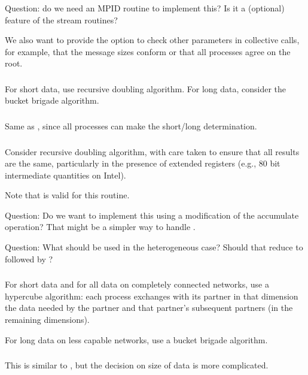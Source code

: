 \documentclass{article}
\begin{document}
Question: do we need an MPID routine to implement this? Is it a
(optional) feature of the stream routines?

We also want to provide the option to check other parameters in
collective calls, for example, that the message sizes conform or that
all processes agree on the root.

\subsubsection{}
For short data, use recursive doubling algorithm.  For long data, consider the
bucket brigade algorithm.

\subsubsection{}
Same as , since all processes can make the
short/long determination.

\subsubsection{}
Consider recursive doubling algorithm, with care taken to ensure that all
results are the same, particularly in the presence of extended registers
(e.g., 80 bit intermediate quantities on Intel).

Note that  is valid for this routine. 

Question: Do we want to implement this using a modification of the accumulate
operation?  That might be a simpler way to handle .

Question: What should be used in the heterogeneous case?  Should that
reduce to  followed by ?

\subsubsection{}
For short data and for all data on completely connected networks, use a
hypercube algorithm: each process exchanges with its partner in that dimension
the data needed by the partner and that partner's subsequent partners (in the
remaining dimensions).

For long data on less capable networks, use a bucket brigade algorithm.

\subsubsection{}
This is similar to , but the decision on size of data is
more complicated.  
\end{document}
